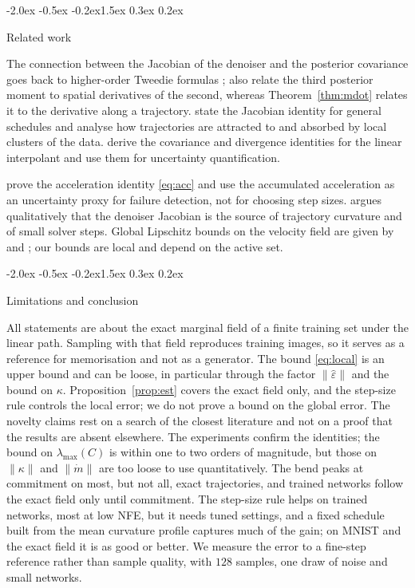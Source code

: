\documentclass{article}
\makeatletter
\renewcommand{\section}{\@startsection{section}{1}{\z@}%
  {-2.0ex \@plus -0.5ex \@minus -0.2ex}{1.5ex \@plus 0.3ex \@minus 0.2ex}{\large\bfseries\raggedright}}
\theoremstyle{remark}
\newcommand{\eps}{\hat\varepsilon}
\newcommand{\lmax}{\lambda_{\max}}
\makeatother
\begin{document}
\section{Related work}\label{sec:related}

The connection between the Jacobian of the denoiser and the posterior covariance goes back to higher-order Tweedie formulas \citep{efron2011tweedie,manor2024posterior}; \citet{manor2024posterior} also relate the third posterior moment to spatial derivatives of the second, whereas Theorem~\ref{thm:mdot} relates it to the derivative along a trajectory. \citet{wan2024elucidating} state the Jacobian identity for general schedules and analyse how trajectories are attracted to and absorbed by local clusters of the data. \citet{lv2026uncertainty} derive the covariance and divergence identities for the linear interpolant and use them for uncertainty quantification.

\citet{rao2026geometry} prove the acceleration identity \eqref{eq:acc} and use the accumulated acceleration as an uncertainty proxy for failure detection, not for choosing step sizes. \citet{milanfar2026lagrangian} argues qualitatively that the denoiser Jacobian is the source of trajectory curvature and of small solver steps. Global Lipschitz bounds on the velocity field are given by \citet{gao2024convergence} and \citet{benton2024error}; our bounds are local and depend on the active set.

\section{Limitations and conclusion}\label{sec:conclusion}

All statements are about the exact marginal field of a finite training set under the linear path. Sampling with that field reproduces training images, so it serves as a reference for memorisation and not as a generator. The bound \eqref{eq:local} is an upper bound and can be loose, in particular through the factor $\|\eps\|$ and the bound on $\kappa$. Proposition~\ref{prop:est} covers the exact field only, and the step-size rule controls the local error; we do not prove a bound on the global error. The novelty claims rest on a search of the closest literature and not on a proof that the results are absent elsewhere. The experiments confirm the identities; the bound on $\lmax(C)$ is within one to two orders of magnitude, but those on $\|\kappa\|$ and $\|\dot m\|$ are too loose to use quantitatively. The bend peaks at commitment on most, but not all, exact trajectories, and trained networks follow the exact field only until commitment. The step-size rule helps on trained networks, most at low NFE, but it needs tuned settings, and a fixed schedule built from the mean curvature profile captures much of the gain; on MNIST and the exact field it is as good or better. We measure the error to a fine-step reference rather than sample quality, with $128$ samples, one draw of noise and small networks.
\end{document}
